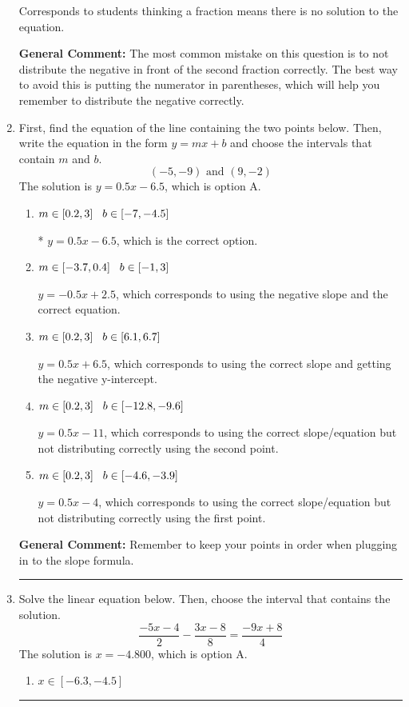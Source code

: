 \documentclass{extbook}[14pt]
\newcommand{\litem}[1]{\item #1

\rule{\textwidth}{0.4pt}}
\begin{document}
\begin{enumerate}
{\begin{enumerate}[label=\Alph*.]
Corresponds to students thinking a fraction means there is no solution to the equation.
\end{enumerate}

\textbf{General Comment:} The most common mistake on this question is to not distribute the negative in front of the second fraction correctly. The best way to avoid this is putting the numerator in parentheses, which will help you remember to distribute the negative correctly.
}
\litem{
First, find the equation of the line containing the two points below. Then, write the equation in the form $ y=mx+b $ and choose the intervals that contain $m$ and $b$.
\[ (-5, -9) \text{ and } (9, -2) \]The solution is \( y = 0.5x -6.5 \), which is option A.\begin{enumerate}[label=\Alph*.]
\item \( m \in [0.2, 3] \hspace*{3mm} b \in [-7, -4.5] \)

* $y = 0.5x -6.5$, which is the correct option.
\item \( m \in [-3.7, 0.4] \hspace*{3mm} b \in [-1, 3] \)

 $y = -0.5x + 2.5$, which corresponds to using the negative slope and the correct equation.
\item \( m \in [0.2, 3] \hspace*{3mm} b \in [6.1, 6.7] \)

 $y = 0.5x + 6.5$, which corresponds to using the correct slope and getting the negative y-intercept.
\item \( m \in [0.2, 3] \hspace*{3mm} b \in [-12.8, -9.6] \)

 $y = 0.5x -11$, which corresponds to using the correct slope/equation but not distributing correctly using the second point.
\item \( m \in [0.2, 3] \hspace*{3mm} b \in [-4.6, -3.9] \)

 $y = 0.5x -4$, which corresponds to using the correct slope/equation but not distributing correctly using the first point.
\end{enumerate}

\textbf{General Comment:} Remember to keep your points in order when plugging in to the slope formula.
}
\litem{
Solve the linear equation below. Then, choose the interval that contains the solution.
\[ \frac{-5x -4}{2} - \frac{3x -8}{8} = \frac{-9x + 8}{4} \]The solution is \( x = -4.800 \), which is option A.\begin{enumerate}[label=\Alph*.]
\item \( x \in [-6.3, -4.5] \)


\end{enumerate}}
\end{enumerate}
\end{document}

